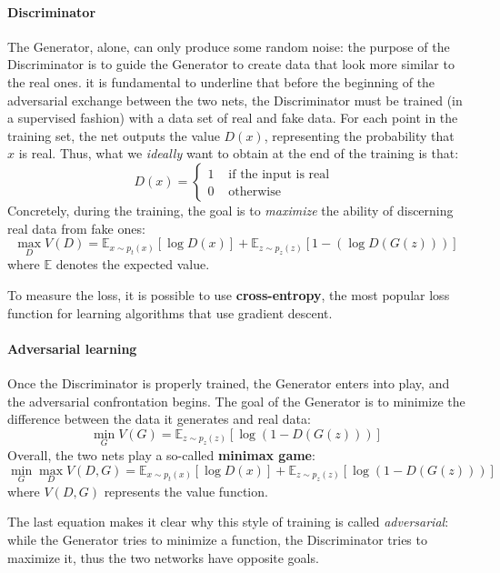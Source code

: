 \documentclass[12pt,a4paper]{book}
\theoremstyle{definition}
\begin{document}
	\paragraph{Discriminator}
	The Generator, alone, can only produce some random noise: the purpose of the Discriminator is to guide the Generator to create data that look more similar to the real ones. it is fundamental to underline that before the beginning of the adversarial exchange between the two nets, the Discriminator must be trained (in a supervised fashion) with a data set of real and fake data.
	For each point in the training set, the net outputs the value $D(x)$, representing the probability that $x$ is real. Thus, what we \textit{ideally} want to obtain at the end of the training is that:
	\[
	D(x) = \begin{cases}
		1 &\text{ if the input is real }\\
		0 & \text{ otherwise }
	\end{cases}
	\]
	Concretely, during the training, the goal is to \textit{maximize} the ability of discerning real data from fake ones:
	\[
	\max_D V(D) = \mathbb{E}_{x\sim p_t(x)}[\log D(x)] + \mathbb{E}_{z\sim p_z(z)}[1-(\log D(G(z)))]
	\]
	where $\mathbb{E}$ denotes the expected value.
	
	To measure the loss, it is possible to use \textbf{cross-entropy}, the most popular loss function for learning algorithms that use gradient descent.
	\paragraph{Adversarial learning}
	Once the Discriminator is properly trained, the Generator enters into play, and the adversarial confrontation begins. The goal of the Generator is to minimize the difference between the data it generates and real data:
	\[
	\min_G V(G) = \mathbb{E}_{z\sim p_z(z)}[\log(1-D(G(z)))]
	\]
	Overall, the two nets play a so-called \textbf{minimax game}:
	\[
	\min_G \max_D V(D,G) = \mathbb{E}_{x\sim p_t(x)}[\log D(x)] + \mathbb{E}_{z\sim p_z(z)}[\log (1-D(G(z)))]
	\]
	where $V(D,G)$ represents the value function.
	
	The last equation makes it clear why this style of training is called \textit{adversarial}: while the Generator tries to minimize a function, the Discriminator tries to maximize it, thus the two networks have opposite goals.
	
\end{document}
